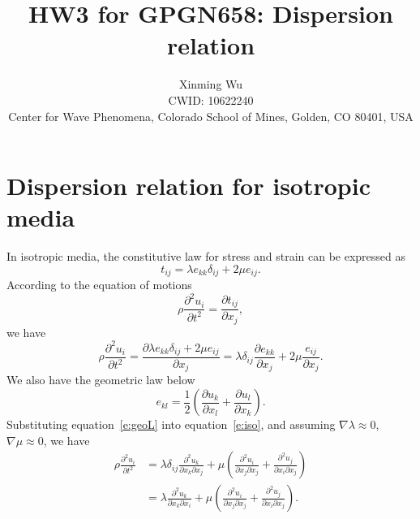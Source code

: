 \documentclass[referee]{../../../texCls/mayWithTeaser}
\begin{document}
\title{HW3 for GPGN658: Dispersion relation}
\author[X.~Wu]
{Xinming Wu\\
CWID: 10622240\\
Center for Wave Phenomena, Colorado School of Mines, Golden, CO 80401, USA}
\maketitle
\section{Dispersion relation for isotropic media}
In isotropic media, the constitutive law for stress and strain can be expressed
as
\begin{equation}
  t_{ij}=\lambda e_{kk}\delta_{ij}+2\mu e_{ij}.
\end{equation}
According to the equation of motions
\begin{equation}
  \rho\frac{\partial^2 u_i}{\partial t^2}=\frac{\partial t_{ij}}{\partial x_j},
\end{equation}
we have
\begin{equation}
  \rho\frac{\partial^2 u_i}{\partial t^2}
  =\frac{\partial \lambda e_{kk}\delta_{ij}+2\mu e_{ij}}{\partial x_j}
  =\lambda\delta_{ij}\frac{\partial e_{kk}}{\partial
  x_j}+2\mu\frac{e_{ij}}{\partial x_j}.
  \label{e:iso}
\end{equation}
We also have the geometric law below
\begin{equation}
  e_{kl}=\frac{1}{2}(\frac{\partial u_k}{\partial x_l}+\frac{\partial
  u_l}{\partial x_k}).
  \label{e:geoL}
\end{equation}
Substituting equation~\ref{e:geoL} into equation~\ref{e:iso}, and assuming
$\nabla\lambda\approx 0$, $\nabla\mu\approx 0$, we have
\begin{equation}
  \begin{split}
  \rho\frac{\partial^2 u_i}{\partial t^2}
  &=\lambda\delta_{ij}
   \frac{\partial^2 u_k}{\partial x_k\partial x_j}
   +\mu(
   \frac{\partial^2 u_i}{\partial x_j\partial x_j}+
   \frac{\partial^2 u_j}{\partial x_i\partial x_j})\\
  &=\lambda
   \frac{\partial^2 u_k}{\partial x_k\partial x_i}
   +\mu(
   \frac{\partial^2 u_i}{\partial x_j\partial x_j}+
   \frac{\partial^2 u_j}{\partial x_i\partial x_j}).
\end{split}
\end{equation}
\end{document}

